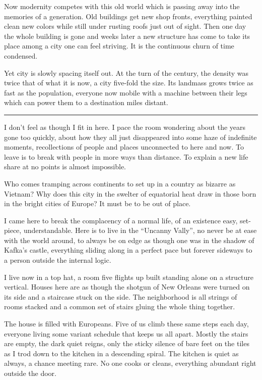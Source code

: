 \documentclass[ebook, 10pt, openright, onecolumn]{memoir}
\newcommand*\td[1]{
  \todo[inline]{
     #1 
  }
}
\newcommand*\starbreak{\fancybreak*{\Large{* * *}}}
\newcommand*\finish{\td{ ----- Finish this section -----}}
\begin{document}
Now modernity competes with this old world which is passing away into the
memories of a generation.  Old buildings get new shop fronts, everything painted
clean new colors while still under rusting roofs just out of sight.  Then one
day the whole building is gone and weeks later a new structure has come to take
its place among a city one can feel striving.  It is the continuous churn of
time condensed.

Yet city is slowly spacing itself out.  At the turn of the century, the density
was twice that of what it is now, a city five-fold the size.  Its landmass grows
twice as fast as the population, everyone now mobile with a machine between
their legs which can power them to a destination miles distant.

\finish

\starbreak

I don't feel as though I fit in here. I pace the room wondering about the years
gone too quickly, about how they all just disappeared into some haze of
indefinite moments, recollections of people and places unconnected to here and
now.  To leave is to break with people in more ways than distance.  To explain a
new life share at no points is almost impossible.

Who comes tramping across continents to set up in a country as bizarre as
Vietnam?  Why does this city in the swelter of equatorial heat draw in those
born in the bright cities of Europe?  It must be to be out of place.

I came here to break the complacency of a normal life, of an existence easy,
set-piece, understandable.  Here is to live in the ``Uncanny Vally'', no never
be at ease with the world around, to always be on edge as though one was in the
shadow of Kafka's castle, everything sliding along in a perfect pace but forever
sideways to a person outside the internal logic.

I live now in a top hat, a room five flights up built standing alone on a
structure vertical.  Houses here are as though the shotgun of New Orleans were
turned on its side and a staircase stuck on the side.  The neighborhood is all
strings of rooms stacked and a common set of stairs gluing the whole thing
together.

The house is filled with Europeans.  Five of us climb these same steps each
day, everyone living some variant schedule that keeps us all apart.  Mostly the
stairs are empty, the dark quiet reigns, only the sticky silence of bare feet
on the tiles as I trod down to the kitchen in a descending spiral.  The kitchen
is quiet as always, a chance meeting rare.  No one cooks or cleans, everything
abundant right outside the door.
\end{document}
